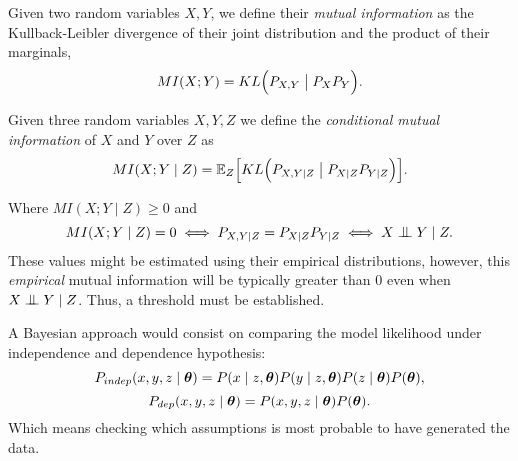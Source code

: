 \begin{definition}
  Given two random variables \(X, Y\), we define their \emph{mutual information} as the Kullback-Leibler divergence of their joint distribution and the product of their marginals,
  \[
    MI(X;Y) = KL\Big(P_{X,Y} \bigm| P_{X}P_{Y}\Big).
  \]
\end{definition}

\begin{definition}
  Given three random variables \(X, Y, Z\) we define the \emph{conditional mutual information} of \(X\) and \(Y\) over \(Z\) as
  \[
    MI(X;Y\mid Z) = \mathbb{E}_{Z}\Big[KL\Big(P_{X,Y \mid Z} \bigm| P_{X\mid Z} P_{Y \mid Z}\Big)\Big].
  \]
\end{definition}
Where \(MI(X;Y \mid Z) \geq 0\) and
\[
MI(X;Y \mid Z) = 0 \iff P_{X,Y \mid Z} = P_{X\mid Z} P_{Y \mid Z} \iff X\bigCI Y \mid Z.
\]
These values might be estimated using their empirical distributions, however, this \emph{empirical} mutual information will be typically greater than \(0\) even when \(X\bigCI Y \mid Z\). Thus, a threshold must be established.

A Bayesian approach would consist on comparing the model likelihood under independence and dependence hypothesis:
\[
  P_{indep}(x,y,z \mid \bm{\theta}) = P(x\mid z, \bm{\theta})P(y \mid z, \bm{\theta})P(z \mid \bm{\theta})P(\bm{\theta}),
\]
\[
P_{dep}(x,y,z \mid \bm{\theta}) = P(x,y,z \mid \bm{\theta})P(\bm{\theta}).
\]
Which means checking which assumptions is most probable to have generated the data.


